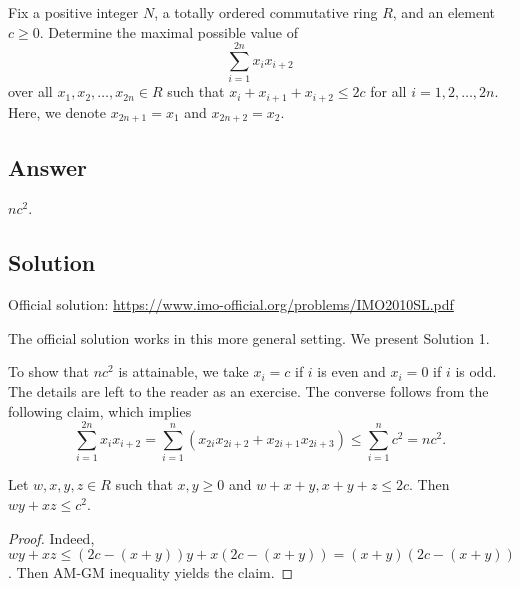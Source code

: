 Fix a positive integer $N$, a totally ordered commutative ring $R$, and an element $c \geq 0$.
Determine the maximal possible value of
\[ \sum_{i = 1}^{2n} x_i x_{i + 2} \tag{*}\label{2010a3-eq0} \]
    over all $x_1, x_2, \ldots, x_{2n} \in R$ such that $x_i + x_{i + 1} + x_{i + 2} \leq 2c$ for all $i = 1, 2, \ldots, 2n$.
Here, we denote $x_{2n + 1} = x_1$ and $x_{2n + 2} = x_2$.



\subsection*{Answer}

$n c^2$.



\subsection*{Solution}

Official solution: \url{https://www.imo-official.org/problems/IMO2010SL.pdf}

The official solution works in this more general setting.
We present Solution 1.

To show that $n c^2$ is attainable, we take $x_i = c$ if $i$ is even and $x_i = 0$ if $i$ is odd.
The details are left to the reader as an exercise.
The converse follows from the following claim, which implies
\[ \sum_{i = 1}^{2n} x_i x_{i + 2} = \sum_{i = 1}^n (x_{2i} x_{2i + 2} + x_{2i + 1} x_{2i + 3}) \leq \sum_{i = 1}^n c^2 = n c^2. \]

\begin{claim}
Let $w, x, y, z \in R$ such that $x, y \geq 0$ and $w + x + y, x + y + z \leq 2c$.
Then $wy + xz \leq c^2$.
\end{claim}
\begin{proof}
Indeed, $wy + xz \leq (2c - (x + y)) y + x (2c - (x + y)) = (x + y)(2c - (x + y))$.
Then AM-GM inequality yields the claim.
\end{proof}
